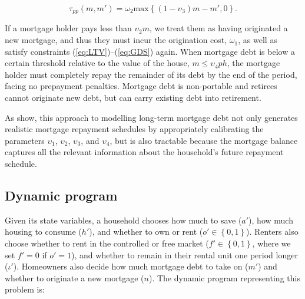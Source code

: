 \documentclass[parskip=full]{article}
\begin{document}
\begin{equation}\label{eq:prepayment_penalty}
\tau_{pp}(m,m')=\omega_{2}\mbox{max}\left\{(1-\upsilon_{3})m-m',0\right\}.
\end{equation}

\noindent If a mortgage holder pays less than $\upsilon_{2}m$, we treat them as having originated a new mortgage, and thus they must incur the origination cost, $\omega_{1}$, as well as satisfy constraints (\ref{eq:LTV})--(\ref{eq:GDS}) again. When mortgage debt is below a certain threshold relative to the value of the house, $m \leq \upsilon_{4}ph$, the mortgage holder must completely repay the remainder of its debt by the end of the period, facing no prepayment penalties. Mortgage debt is non-portable and retirees cannot originate new debt, but can carry existing debt into retirement.

As \citet{rs-2023} show, this approach to modelling long-term mortgage debt not only generates realistic mortgage repayment schedules by appropriately calibrating the parameters $\upsilon_1$, $\upsilon_2$, $\upsilon_3$, and $\upsilon_4$, but is also tractable because the mortgage balance captures all the relevant information about the household's future repayment schedule.

\subsection{Dynamic program}\label{subsection:household_optimization}
Given its state variables, a household chooses how much to save ($a'$), how much housing to consume ($h'$), and whether to own or rent ($o' \in \left\{0,1\right\}$). Renters also choose whether to rent in the controlled or free market ($f' \in \left\{0,1\right\}$, where we set $f'=0$ if $o'=1$), and whether to remain in their rental unit one period longer ($\iota'$). Homeowners also decide how much mortgage debt to take on ($m'$) and whether to originate a new mortgage ($n$). The dynamic program representing this problem is:
\end{document}
